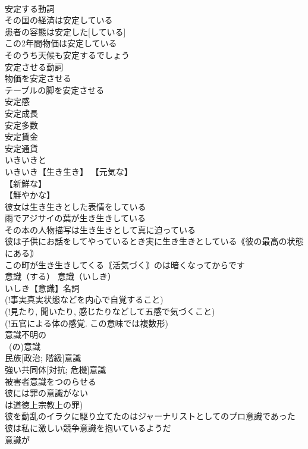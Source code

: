 \documentclass[8pt]{extreport}
\begin{document}
\begin{CJK}{UTF8}{min}
\\	安定する動詞 
\\	その国の経済は安定している 
\\	患者の容態は安定した[している] 
\\	この2年間物価は安定している 
\\	そのうち天候も安定するでしょう 
\\	安定させる動詞 
\\	物価を安定させる 
\\	テーブルの脚を安定させる 
\\	安定感 
\\	安定成長 
\\	安定多数 
\\	安定賃金 
\\	安定通貨 
\\	いきいきと		
\\	いきいき【生き生き】 【元気な】
\\	【新鮮な】
\\	【鮮やかな】
\\	彼女は生き生きとした表情をしている 
\\	雨でアジサイの葉が生き生きしている 
\\	その本の人物描写は生き生きとして真に迫っている 
\\	彼は子供にお話をしてやっているとき実に生き生きとしている｟彼の最高の状態にある｠ 
\\	この町が生き生きしてくる｟活気づく｠のは暗くなってからです 
\\	意識（する）		意識（いしき） 
\\	いしき【意識】名詞 
\\	(!事実真実状態などを内心で自覚すること) 
\\	(!見たり, 聞いたり, 感じたりなどして五感で気づくこと) 
\\	(!五官による体の感覚. この意味では複数形) 
\\	意識不明の 
\\	~(の)意識 
\\	民族[政治; 階級]意識 
\\	強い共同体[対抗; 危機]意識 
\\	被害者意識をつのらせる 
\\	彼には罪の意識がない 
\\	は道徳上宗教上の罪) 
\\	彼を動乱のイラクに駆り立てたのはジャーナリストとしてのプロ意識であった 
\\	彼は私に激しい競争意識を抱いているようだ 
\\	意識が 

\end{CJK}
\end{document}
